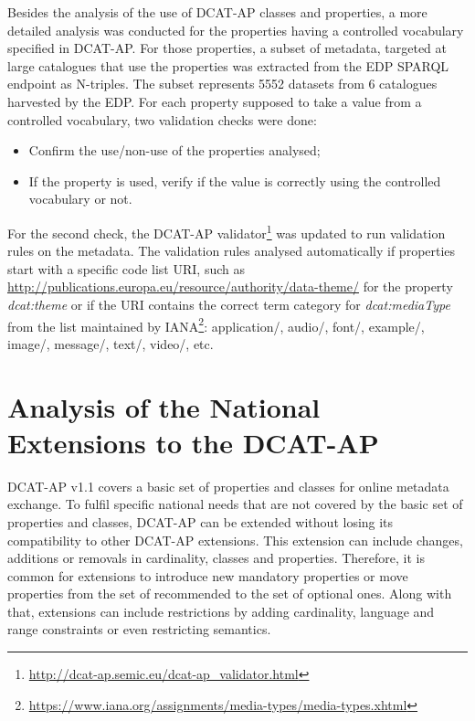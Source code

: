 \documentclass[<options>]{elsarticle}
\begin{document}
Besides the analysis of the use of DCAT-AP classes and properties, a more detailed analysis was conducted for the properties having a controlled vocabulary specified in DCAT-AP. For those properties, a subset of metadata, targeted at large catalogues that use the properties was extracted from the EDP SPARQL endpoint as N-triples. The subset represents 5552 datasets from 6 catalogues harvested by the EDP. For each property supposed to take a value from a controlled vocabulary, two validation checks were done:

\begin{itemize}
\item Confirm the use/non-use of the properties analysed;
\item If the property is used, verify if the value is correctly using the controlled vocabulary or not.
\end{itemize}

For the second check, the DCAT-AP validator\footnote{\href{ http://dcat-ap.semic.eu/dcat-ap_validator.html}{ http://dcat-ap.semic.eu/dcat-ap\_validator.html}} was updated to run validation rules on the metadata. The validation rules analysed automatically if properties start with a specific code list URI, such as \url{http://publications.europa.eu/resource/authority/data-theme/} for the property \textit{dcat:theme} or if the URI contains the correct term category for \textit{dcat:mediaType} from the list maintained by IANA\footnote{\href{  https://www.iana.org/assignments/media-types/media-types.xhtml}{https://www.iana.org/assignments/media-types/media-types.xhtml}}: application/, audio/, font/, example/, image/, message/, text/, video/, etc. 

\section{Analysis of the National Extensions to the DCAT-AP}
DCAT-AP v1.1 covers a basic set of properties and classes for online metadata exchange. To fulfil specific national needs that are not covered by the basic set of properties and classes, DCAT-AP can be extended without losing its compatibility to other DCAT-AP extensions. This extension can include changes, additions or removals in cardinality, classes and properties. Therefore, it is common for extensions to introduce new mandatory properties or move properties from the set of recommended to the set of optional ones. Along with that, extensions can include restrictions by adding cardinality, language and range constraints or even restricting semantics.
\end{document}
